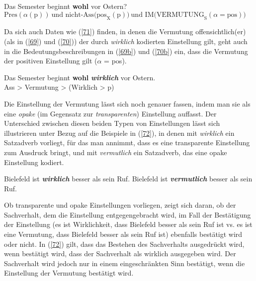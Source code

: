 \begin{exe}
	\ex\label{70} 
		\begin{xlist}	
			\ex\label{70a} Das Semester beginnt \textbf{wohl} vor Ostern?
			\ex\label{70b} $\textrm{Pres}(\alpha(\textrm{p})) \ \textrm{und nicht-Ass(pos}_{\textrm{X}}(\textrm{p})) \  \textrm{und IM(VERMUTUNG}_{\textrm{S}}(\alpha = \textrm{pos}))$
		\end{xlist}
\end{exe}
Da sich auch Daten wie (\ref{71}) finden, in denen die Vermutung offensichtlich(er) (als in (\ref{69}) und (\ref{70})) der durch \textit{wirklich} kodierten Einstellung gilt, geht auch in die Bedeutungsbeschreibungen in (\ref{69b}) und (\ref{70b}) ein, dass die Vermutung der positiven Einstellung gilt ($\alpha$ = \textrm{pos}).

\begin{exe}
	\ex\label{71} 
	Das Semester beginnt \textbf{wohl} \textbf{\textit{wirklich}} vor Ostern.\\
	Ass > Vermutung > (Wirklich > p)	
\end{exe}
Die Einstellung der Vermutung lässt sich noch genauer fassen, indem man sie als eine \textit{opake}  (im Gegensatz zur \textit{transparenten})  Einstellung auffasst. Der Unterschied zwischen diesen beiden Typen von Einstellungen lässt sich illustrieren unter Bezug auf die Beispiele in (\ref{72}), in denen mit \textit{wirklich} ein Satzadverb vorliegt, für das man annimmt, dass es eine transparente Einstellung zum Ausdruck bringt, und mit \textit{vermutlich} ein Satzadverb, das eine opake Einstellung kodiert.

\begin{exe}
	\ex\label{72} 
		\begin{xlist}	
			\ex\label{72a} Bielefeld ist \textbf{\textit{wirklich}} besser als sein Ruf.
			\ex\label{72b} Bielefeld ist \textbf{\textit{vermutlich}} besser als sein Ruf.
		\end{xlist}
\end{exe}	
Ob transparente und opake Einstellungen vorliegen, zeigt sich daran, ob der Sachverhalt, dem die Einstellung entgegengebracht wird, im Fall der Bestätigung der Einstellung (es ist Wirklichkeit, dass Bielefeld besser als sein Ruf ist vs. es ist eine Vermutung, dass Bielefeld besser als sein Ruf ist) ebenfalls bestätigt wird oder nicht. In (\ref{72}) gilt, dass das Bestehen des Sachverhalts ausgedrückt wird, wenn bestätigt wird, dass der Sachverhalt als wirklich ausgegeben wird. Der Sachverhalt wird jedoch nur in einem eingeschränkten Sinn bestätigt, wenn die Einstellung der Vermutung bestätigt wird. 

